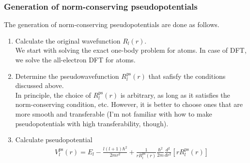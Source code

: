 \documentclass{article}
\begin{document}
\subsubsection{Generation of norm-conserving pseudopotentials}
The generation of norm-conserving pseudopotentials are done as follows.
\begin{enumerate}
  \item Calculate the original wavefunction $R_l(r)$.\\
  We start with solving the exact one-body problem for atoms. In case of DFT, we solve the all-electron DFT for atoms.
  \item Determine the pseudowavefunction $R^{\text{ps}}_l(r)$ that safisfy the conditions discussed above.\\
  In principle, the choice of $R^{\text{ps}}_l(r)$ is arbitrary, as long as it satisfies the norm-conserving condition, etc.
  However, it is better to choose ones that are more smooth and transferable (I'm not familiar with how to make pseudopotentials with high transferability, though).
  \item Calculate pseudopotential
  \begin{align}
    V^{\text{ps}}_l(r) = E_l - \frac{l(l+1)\hbar^2}{2mr^2} + \frac{1}{rR^{\text{ps}}_l(r)}  \frac{\hbar^2}{2m} \frac{d^2}{dr^2} [rR^{\text{ps}}_l(r)]
  \end{align}
\end{enumerate}
\end{document}
